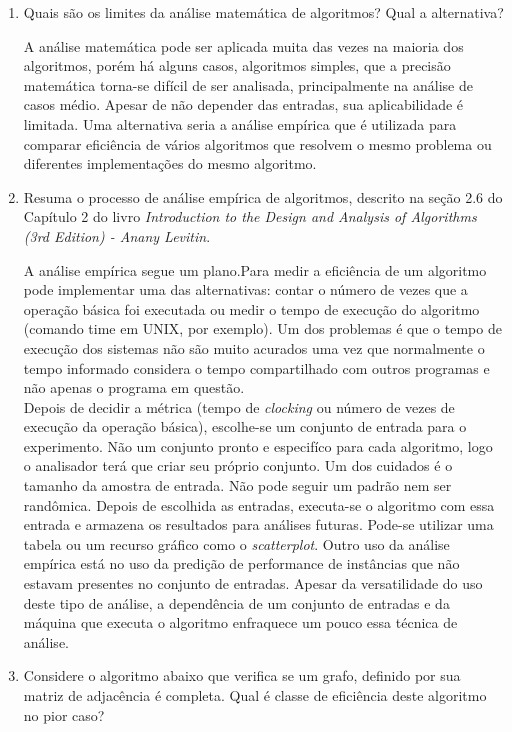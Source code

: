 \documentclass[12pt,a4paper]{article}
\begin{document}
\begin{enumerate}
	\item Quais são os limites da análise matemática de algoritmos? Qual a alternativa?
	
	A análise matemática pode ser aplicada muita das vezes na maioria dos algoritmos, porém há alguns casos, algoritmos simples, que a precisão matemática torna-se difícil de ser analisada, principalmente na análise de casos médio. Apesar de não depender das entradas, sua aplicabilidade é limitada. Uma alternativa seria a análise empírica que é utilizada para comparar eficiência de vários algoritmos que resolvem o mesmo problema ou diferentes implementações do mesmo algoritmo.	
	
	
	\item Resuma o processo de análise empírica de algoritmos, descrito na seção 2.6 do Capítulo 2 do livro \textit{Introduction to the Design and Analysis of Algorithms (3rd Edition) - Anany Levitin}.
	
	A análise empírica segue um plano.Para medir a eficiência de um algoritmo pode implementar uma das alternativas: contar o número de vezes que a operação básica foi executada ou medir o tempo de execução do algoritmo (comando time em UNIX, por exemplo). Um dos problemas é que o tempo de execução dos sistemas não são muito acurados uma vez que normalmente o tempo informado considera o tempo compartilhado com outros programas e não apenas o programa em questão.\\
	Depois de decidir a métrica (tempo de \textit{clocking} ou número de vezes de execução da operação básica), escolhe-se um conjunto de entrada para o experimento. Não um conjunto pronto e especifíco para cada algoritmo, logo o analisador terá que criar seu próprio conjunto. Um dos cuidados é o tamanho da amostra de entrada. Não pode seguir um padrão nem ser randômica.  
	Depois de escolhida as entradas, executa-se o algoritmo com essa entrada e armazena os resultados para análises futuras. Pode-se utilizar uma tabela ou um recurso gráfico como o \textit{scatterplot}. 
	Outro uso da análise empírica está no uso da predição de performance de instâncias que não estavam presentes no conjunto de entradas. Apesar da versatilidade do uso deste tipo de análise, a dependência de um conjunto de entradas e da máquina que executa o algoritmo enfraquece um pouco essa técnica de análise.
	
	
	\item Considere o algoritmo abaixo que verifica se um grafo, definido por sua matriz de adjacência é completa. Qual é classe de eficiência deste algoritmo no pior caso?
	

\end{enumerate}
\end{document}
